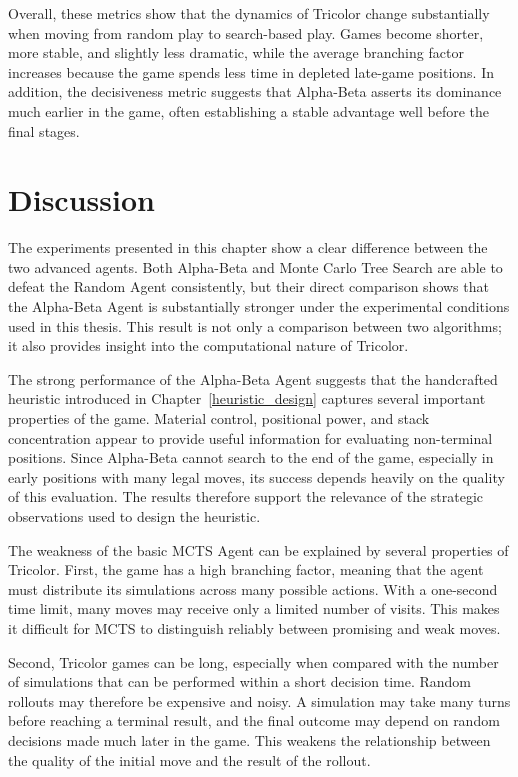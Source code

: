 Overall, these metrics show that the dynamics of Tricolor change substantially when moving from random play to search-based play. Games become shorter, more stable, and slightly less dramatic, while the average branching factor increases because the game spends less time in depleted late-game positions. In addition, the decisiveness metric suggests that Alpha-Beta asserts its dominance much earlier in the game, often establishing a stable advantage well before the final stages.

\section{Discussion}

The experiments presented in this chapter show a clear difference between the two advanced agents. Both Alpha-Beta and Monte Carlo Tree Search are able to defeat the Random Agent consistently, but their direct comparison shows that the Alpha-Beta Agent is substantially stronger under the experimental conditions used in this thesis. This result is not only a comparison between two algorithms; it also provides insight into the computational nature of Tricolor.

The strong performance of the Alpha-Beta Agent suggests that the handcrafted heuristic introduced in Chapter~\ref{heuristic_design} captures several important properties of the game. Material control, positional power, and stack concentration appear to provide useful information for evaluating non-terminal positions. Since Alpha-Beta cannot search to the end of the game, especially in early positions with many legal moves, its success depends heavily on the quality of this evaluation. The results therefore support the relevance of the strategic observations used to design the heuristic.

The weakness of the basic MCTS Agent can be explained by several properties of Tricolor. First, the game has a high branching factor, meaning that the agent must distribute its simulations across many possible actions. With a one-second time limit, many moves may receive only a limited number of visits. This makes it difficult for MCTS to distinguish reliably between promising and weak moves.

Second, Tricolor games can be long, especially when compared with the number of simulations that can be performed within a short decision time. Random rollouts may therefore be expensive and noisy. A simulation may take many turns before reaching a terminal result, and the final outcome may depend on random decisions made much later in the game. This weakens the relationship between the quality of the initial move and the result of the rollout.


